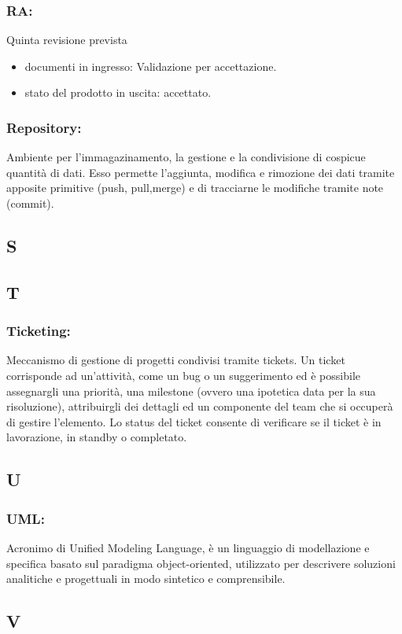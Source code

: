 \subsubsection*{RA:} Quinta revisione prevista
\begin{itemize}
\item documenti in ingresso: Validazione per accettazione.
\item stato del prodotto in uscita: accettato. 
\end{itemize}

\subsubsection*{Repository:} Ambiente per l'immagazinamento, la gestione e la
condivisione di cospicue quantit\`a di dati. Esso permette l'aggiunta,
 modifica e rimozione dei dati tramite apposite primitive (push, pull,merge)
  e di tracciarne le modifiche tramite note (commit).
\subsection*{S}
\subsection*{T}
\subsubsection*{Ticketing:} Meccanismo di gestione di progetti condivisi tramite
tickets. Un ticket corrisponde ad un'attivit\`a, come un bug o un suggerimento
ed \`e possibile assegnargli una priorit\`a, una milestone (ovvero una ipotetica
data per la sua risoluzione), attribuirgli dei dettagli ed un componente del
team che si occuper\`a di gestire l'elemento. Lo status del ticket consente di
verificare se il ticket \`e in lavorazione, in standby o completato.

\subsection*{U}
\subsubsection*{UML:} Acronimo di Unified Modeling Language, \`e un linguaggio
di modellazione e specifica basato sul paradigma object-oriented, utilizzato per descrivere soluzioni analitiche e progettuali in modo sintetico e comprensibile.
\subsection*{V}

